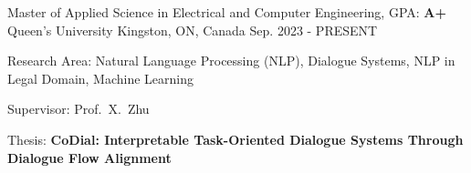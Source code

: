 

\begin{cventries}

  \cventry
    {Master of Applied Science in Electrical and Computer Engineering, GPA: \textbf{A+}} %
    {Queen's University} %
    {Kingston, ON, Canada} %
    {Sep. 2023 - PRESENT} %
    {
      \begin{cvitems}
		\item{
          Research Area: Natural Language Processing (NLP), Dialogue Systems, NLP in Legal Domain, Machine Learning
        }
        \item{
          Supervisor: Prof.~X.~Zhu
        }
        \item{Thesis: \textbf{CoDial: Interpretable Task-Oriented Dialogue Systems Through Dialogue Flow Alignment}}
      \end{cvitems}
    }



\end{cventries}
